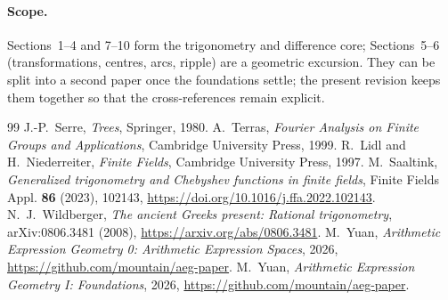 \documentclass[11pt]{article}
\theoremstyle{definition}
\theoremstyle{remark}
\begin{document}
\paragraph{Scope.}
Sections~1--4 and 7--10 form the trigonometry and difference core;
Sections~5--6 (transformations, centres, arcs, ripple) are a geometric
excursion.  They can be split into a second paper once the foundations settle;
the present revision keeps them together so that the cross-references remain
explicit.

\begin{thebibliography}{99}
 J.-P.~Serre, \emph{Trees}, Springer, 1980.
 A.~Terras, \emph{Fourier Analysis on Finite Groups and
Applications}, Cambridge University Press, 1999.
 R.~Lidl and H.~Niederreiter, \emph{Finite Fields},
Cambridge University Press, 1997.
 M.~Saaltink, \emph{Generalized trigonometry and Chebyshev
functions in finite fields}, Finite Fields Appl. \textbf{86} (2023), 102143,
\url{https://doi.org/10.1016/j.ffa.2022.102143}.
 N.~J.~Wildberger, \emph{The ancient Greeks present:
Rational trigonometry}, arXiv:0806.3481 (2008),
\url{https://arxiv.org/abs/0806.3481}.
 M.~Yuan, \emph{Arithmetic Expression Geometry 0: Arithmetic
Expression Spaces}, 2026, \url{https://github.com/mountain/aeg-paper}.
 M.~Yuan, \emph{Arithmetic Expression Geometry I: Foundations},
2026, \url{https://github.com/mountain/aeg-paper}.
\end{thebibliography}
\end{document}
